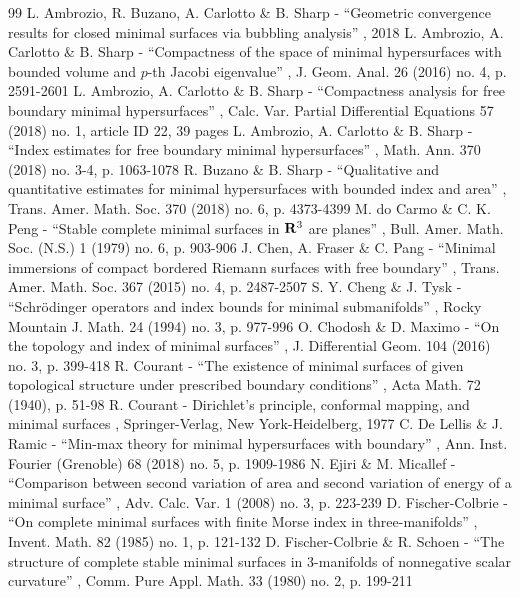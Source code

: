 \documentclass[10pt]{amsart}
\theoremstyle{definition}
\begin{document}
\begin{thebibliography}{99}
 L. Ambrozio, R. Buzano, A. Carlotto \& B. Sharp - “Geometric convergence results for closed minimal surfaces via bubbling analysis” , 2018
 L. Ambrozio, A. Carlotto \& B. Sharp - “Compactness of the space of minimal hypersurfaces with bounded volume and $p$-th Jacobi eigenvalue” , J. Geom. Anal. 26 (2016) no. 4, p. 2591-2601
 L. Ambrozio, A. Carlotto \& B. Sharp - “Compactness analysis for free boundary minimal hypersurfaces” , Calc. Var. Partial Differential Equations 57 (2018) no. 1, article ID 22, 39 pages
 L. Ambrozio, A. Carlotto \& B. Sharp - “Index estimates for free boundary minimal hypersurfaces” , Math. Ann. 370 (2018) no. 3-4, p. 1063-1078
 R. Buzano \& B. Sharp - “Qualitative and quantitative estimates for minimal hypersurfaces with bounded index and area” , Trans. Amer. Math. Soc. 370 (2018) no. 6, p. 4373-4399
 M. do Carmo \& C. K. Peng - “Stable complete minimal surfaces in ${\bf R}^{3}$ are planes” , Bull. Amer. Math. Soc. (N.S.) 1 (1979) no. 6, p. 903-906
 J. Chen, A. Fraser \& C. Pang - “Minimal immersions of compact bordered Riemann surfaces with free boundary” , Trans. Amer. Math. Soc. 367 (2015) no. 4, p. 2487-2507
 S. Y. Cheng \& J. Tysk - “Schrödinger operators and index bounds for minimal submanifolds” , Rocky Mountain J. Math. 24 (1994) no. 3, p. 977-996
 O. Chodosh \& D. Maximo - “On the topology and index of minimal surfaces” , J. Differential Geom. 104 (2016) no. 3, p. 399-418
 R. Courant - “The existence of minimal surfaces of given topological structure under prescribed boundary conditions” , Acta Math. 72 (1940), p. 51-98
 R. Courant - Dirichlet’s principle, conformal mapping, and minimal surfaces , Springer-Verlag, New York-Heidelberg, 1977
 C. De Lellis \& J. Ramic - “Min-max theory for minimal hypersurfaces with boundary” , Ann. Inst. Fourier (Grenoble) 68 (2018) no. 5, p. 1909-1986
 N. Ejiri \& M. Micallef - “Comparison between second variation of area and second variation of energy of a minimal surface” , Adv. Calc. Var. 1 (2008) no. 3, p. 223-239
 D. Fischer-Colbrie - “On complete minimal surfaces with finite Morse index in three-manifolds” , Invent. Math. 82 (1985) no. 1, p. 121-132
 D. Fischer-Colbrie \& R. Schoen - “The structure of complete stable minimal surfaces in $3$-manifolds of nonnegative scalar curvature” , Comm. Pure Appl. Math. 33 (1980) no. 2, p. 199-211

\end{thebibliography}
\end{document}
